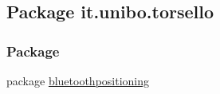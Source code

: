 \hypertarget{namespaceit_1_1unibo_1_1torsello}{}\subsection{Package it.\+unibo.\+torsello}
\label{namespaceit_1_1unibo_1_1torsello}
\subsubsection*{Package}
\begin{DoxyCompactItemize}
\item 
package \hyperlink{namespaceit_1_1unibo_1_1torsello_1_1bluetoothpositioning}{bluetoothpositioning}
\end{DoxyCompactItemize}
